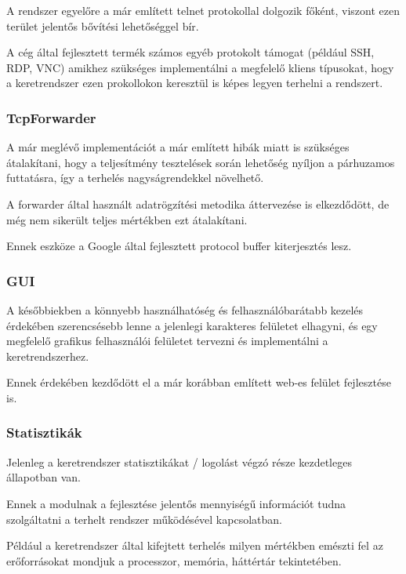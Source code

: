 \documentclass[a4paper,12pt,oneside]{report}
\begin{document}
A rendszer egyelőre a már említett telnet protokollal dolgozik főként, viszont ezen terület jelentős bővítési lehetőséggel bír.

A cég által fejlesztett termék számos egyéb protokolt támogat (például SSH, RDP, VNC) amikhez szükséges implementálni a megfelelő kliens típusokat, hogy a keretrendszer ezen prokollokon keresztül is képes legyen terhelni a rendszert.

\subsubsection{TcpForwarder}

A már meglévő implementációt a már említett hibák miatt is szükséges átalakítani, hogy a teljesítmény tesztelések során lehetőség nyíljon a párhuzamos futtatásra, így a terhelés nagyságrendekkel növelhető.


A forwarder által használt adatrögzítési metodika áttervezése is elkezdődött, de még nem sikerült teljes mértékben ezt átalakítani.

Ennek eszköze a Google által fejlesztett protocol buffer kiterjesztés lesz. \cite{website:protobuf}



\subsubsection{GUI}

A későbbiekben a könnyebb használhatóség és felhasználóbarátabb kezelés érdekében szerencsésebb lenne a jelenlegi karakteres felületet elhagyni, és egy megfelelő grafikus felhasználói felületet tervezni és implementálni a keretrendszerhez.

Ennek érdekében kezdődött el a már korábban említett web-es felület fejlesztése is.

\subsubsection{Statisztikák}

Jelenleg a keretrendszer statisztikákat / logolást végzó része kezdetleges állapotban van.

Ennek a modulnak a fejlesztése jelentős mennyiségű információt tudna szolgáltatni a terhelt rendszer működésével kapcsolatban.

Például a keretrendszer által kifejtett terhelés milyen mértékben emészti fel az erőforrásokat mondjuk a processzor, memória, háttértár tekintetében.
\end{document}

